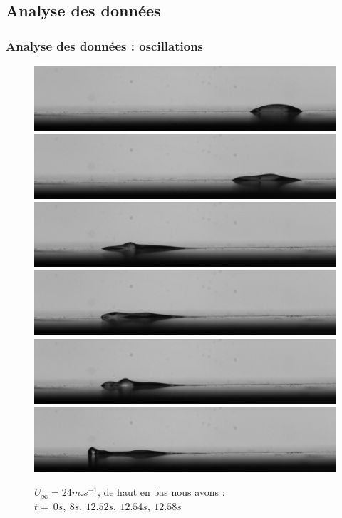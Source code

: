 \documentclass{beamer}
\begin{document}
\subsection{Analyse des données}
\begin{frame}
\frametitle{Analyse des données : oscillations}
\begin{figure}[!ht]
		\includegraphics[width = 0.35\linewidth]{./image/test.jpg}\\
		\includegraphics[width = 0.35\linewidth]{./image/test400.jpg}\\
		\includegraphics[width = 0.35\linewidth]{./image/test626.jpg}\\
		\includegraphics[width = 0.35\linewidth]{./image/test627.jpg}\\
		\includegraphics[width = 0.35\linewidth]{./image/test628.jpg}\\
		\includegraphics[width = 0.35\linewidth]{./image/test629.jpg}
	\caption{$U_{\infty}=24m.s^{-1}$, de haut en bas nous avons :\\
	$t = ~0s,~8s,~12.52s,~12.54s,~12.58s$}
		\label{fig:test}
\end{figure}
\end{frame}
\end{document}
